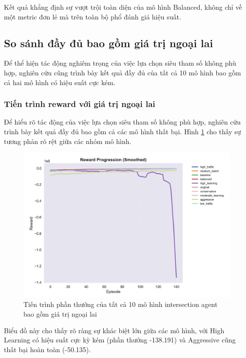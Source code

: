 Kết quả khẳng định sự vượt trội toàn diện của mô hình Balanced, không chỉ về một metric đơn lẻ mà trên toàn bộ phổ đánh giá hiệu suất.

\subsection{So sánh đầy đủ bao gồm giá trị ngoại lai}

Để thể hiện tác động nghiêm trọng của việc lựa chọn siêu tham số không phù hợp,
nghiên cứu cũng trình bày kết quả đầy đủ của tất cả 10 mô hình bao gồm cả hai mô
hình có hiệu suất cực kém.

\subsubsection{Tiến trình reward với giá trị ngoại lai}
Để hiểu rõ tác động của việc lựa chọn siêu tham số không phù hợp, nghiên cứu trình bày kết quả đầy đủ bao gồm cả các mô hình thất bại. Hình \ref{fig:intersection_full_reward_progress} cho thấy sự tương phản rõ rệt giữa các nhóm mô hình.

\begin{figure}[!htp]
    \centering
    \includegraphics[width=\textwidth]{
        figures/individual_plots/intersection_full_reward_progress.png
    }
    \caption{Tiến trình phần thưởng của tất cả 10 mô hình intersection agent bao gồm giá trị ngoại lai}
    \label{fig:intersection_full_reward_progress}
\end{figure}

Biểu đồ này cho thấy rõ ràng sự khác biệt lớn giữa các mô hình, với High Learning có hiệu suất cực kỳ kém (phần thưởng -138.191) và Aggressive cũng thất bại hoàn toàn (-50.135).

